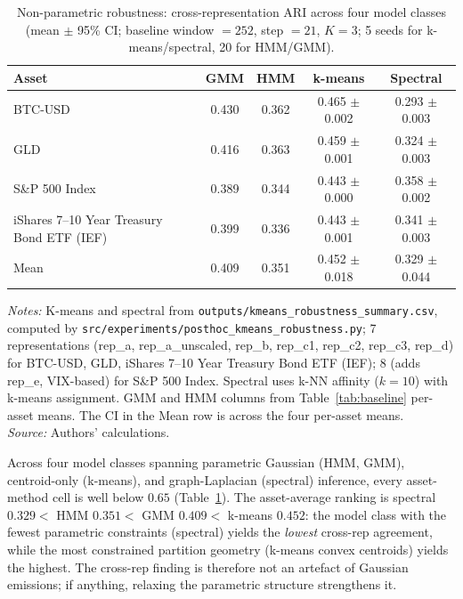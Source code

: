 \documentclass[preprint,12pt,authoryear]{elsarticle}
\newcommand{\SPX}{S\&P 500 Index}
\newcommand{\IEF}{iShares 7--10 Year Treasury Bond ETF (IEF)}
\begin{document}
\begin{table}[!htbp]
\centering
\small
\setlength{\tabcolsep}{6pt}
\caption{Non-parametric robustness: cross-representation ARI across four model classes (mean $\pm$ 95\% CI; baseline window $=252$, step $=21$, $K=3$; 5 seeds for k-means/spectral, 20 for HMM/GMM).}
\label{tab:kmeans_robustness}
\begin{tabular}{lcccc}
\toprule
Asset & GMM & HMM & k-means & Spectral \\
\midrule
BTC-USD  & 0.430 & 0.362 & 0.465 $\pm$ 0.002 & 0.293 $\pm$ 0.003 \\
GLD      & 0.416 & 0.363 & 0.459 $\pm$ 0.001 & 0.324 $\pm$ 0.003 \\
\SPX{}   & 0.389 & 0.344 & 0.443 $\pm$ 0.000 & 0.358 $\pm$ 0.002 \\
\IEF{}   & 0.399 & 0.336 & 0.443 $\pm$ 0.001 & 0.341 $\pm$ 0.003 \\
\midrule
Mean     & 0.409 & 0.351 & 0.452 $\pm$ 0.018 & 0.329 $\pm$ 0.044 \\
\bottomrule
\end{tabular}
\par\medskip
\footnotesize
\textit{Notes:} K-means and spectral from \texttt{outputs/kmeans\_robustness\_summary.csv}, computed by \texttt{src/experiments/posthoc\_kmeans\_robustness.py}; 7 representations (rep\_a, rep\_a\_unscaled, rep\_b, rep\_c1, rep\_c2, rep\_c3, rep\_d) for BTC-USD, GLD, \IEF{}; 8 (adds rep\_e, VIX-based) for \SPX{}. Spectral uses k-NN affinity ($k=10$) with k-means assignment. GMM and HMM columns from Table~\ref{tab:baseline} per-asset means. The CI in the Mean row is across the four per-asset means.\\
\textit{Source:} Authors' calculations.
\end{table}

Across four model classes spanning parametric Gaussian (HMM, GMM), centroid-only (k-means), and graph-Laplacian (spectral) inference, every asset-method cell is well below $0.65$ (Table~\ref{tab:kmeans_robustness}). The asset-average ranking is spectral $0.329 <$ HMM $0.351 <$ GMM $0.409 <$ k-means $0.452$: the model class with the fewest parametric constraints (spectral) yields the \emph{lowest} cross-rep agreement, while the most constrained partition geometry (k-means convex centroids) yields the highest. The cross-rep finding is therefore not an artefact of Gaussian emissions; if anything, relaxing the parametric structure strengthens it.
\end{document}
